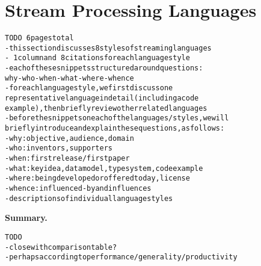 \section{Stream Processing Languages}\label{sec:languages}

\begin{alltt}TODO\scriptsize ~6 pages total
- this section discusses 8 styles of streaming languages
  - ~1 column and ~8 citations for each language style
  - each of these snippets structured around questions:
    why-who-when-what-where-whence
  - for each language style, we first discuss one
    representative language in detail (including a code
    example), then briefly review other related languages
- before the snippets on each of the languages/styles, we will
  briefly introduce and explain these questions, as follows:
  - why: objective, audience, domain
  - who: inventors, supporters
  - when: first release / first paper
  - what: key idea, data model, type system, code example
  - where: being developed or offered today, license
  - whence: influenced-by and influences
- descriptions of individual language styles
\end{alltt}









\textbf{Summary.}
\begin{alltt}TODO\scriptsize
- close with comparison table?
- perhaps according to performance/generality/productivity
\end{alltt}
